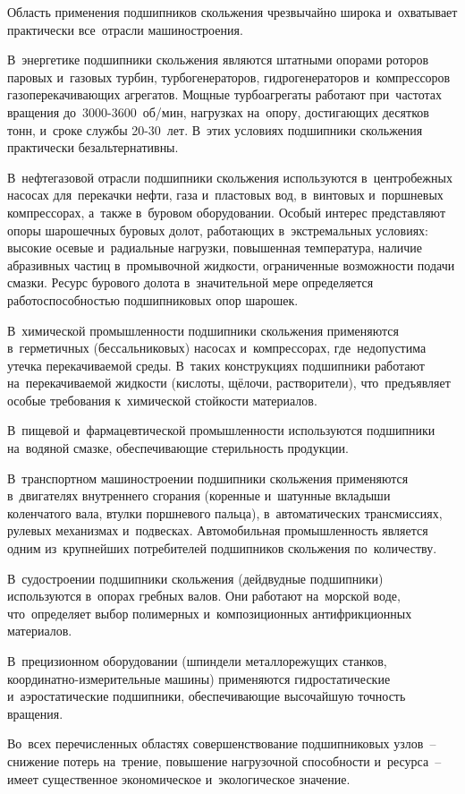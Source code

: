 Область применения подшипников скольжения чрезвычайно широка и~охватывает практически все~отрасли машиностроения.

В~энергетике подшипники скольжения являются штатными опорами роторов паровых и~газовых турбин, турбогенераторов, гидрогенераторов и~компрессоров газоперекачивающих агрегатов. Мощные турбоагрегаты работают при~частотах вращения до~3000-3600~об/мин, нагрузках на~опору, достигающих десятков тонн, и~сроке службы 20-30~лет. В~этих условиях подшипники скольжения практически безальтернативны.

В~нефтегазовой отрасли подшипники скольжения используются в~центробежных насосах для~перекачки нефти, газа и~пластовых вод, в~винтовых и~поршневых компрессорах, а~также в~буровом оборудовании. Особый интерес представляют опоры шарошечных буровых долот, работающих в~экстремальных условиях: высокие осевые и~радиальные нагрузки, повышенная температура, наличие абразивных частиц в~промывочной жидкости, ограниченные возможности подачи смазки. Ресурс бурового долота в~значительной мере определяется работоспособностью подшипниковых опор шарошек.

В~химической промышленности подшипники скольжения применяются в~герметичных (бессальниковых) насосах и~компрессорах, где~недопустима утечка перекачиваемой среды. В~таких конструкциях подшипники работают на~перекачиваемой жидкости (кислоты, щёлочи, растворители), что~предъявляет особые требования к~химической стойкости материалов.

В~пищевой и~фармацевтической промышленности используются подшипники на~водяной смазке, обеспечивающие стерильность продукции.

В~транспортном машиностроении подшипники скольжения применяются в~двигателях внутреннего сгорания (коренные и~шатунные вкладыши коленчатого вала, втулки поршневого пальца), в~автоматических трансмиссиях, рулевых механизмах и~подвесках. Автомобильная промышленность является одним из~крупнейших потребителей подшипников скольжения по~количеству.

В~судостроении подшипники скольжения (дейдвудные подшипники) используются в~опорах гребных валов. Они работают на~морской воде, что~определяет выбор полимерных и~композиционных антифрикционных материалов.

В~прецизионном оборудовании (шпиндели металлорежущих станков, координатно-измерительные машины) применяются гидростатические и~аэростатические подшипники, обеспечивающие высочайшую точность вращения.

Во~всех перечисленных областях совершенствование подшипниковых узлов~-- снижение потерь на~трение, повышение нагрузочной способности и~ресурса~-- имеет существенное экономическое и~экологическое значение.

